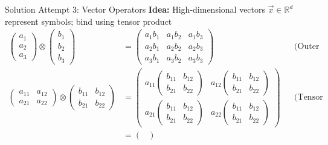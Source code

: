\documentclass[handout,aspectratio=169]{beamer}
\begin{document}
	\begin{frame}{Solution Attempt 3: Vector Operators}
		\centering
		\textbf{Idea:}  High-dimensional vectors $\vec x \in \mathbb{R}^d$ represent symbols; bind using tensor product\\\vspace*{-0.33cm}
		\small
		\begin{align*}
		\begin{pmatrix}a_1\\a_2\\a_3\end{pmatrix} \otimes \begin{pmatrix}b_1\\b_2\\b_3\end{pmatrix} &=
		\begin{pmatrix}
		a_1 b_1 & a_1 b_2 & a_1 b_3 \\
		a_2 b_1 & a_2 b_2 & a_2 b_3 \\
		a_3 b_1 & a_3 b_2 & a_3 b_3
		\end{pmatrix} && \text{(Outer product)} \\[0.25cm]
		\begin{pmatrix}a_{11} & a_{12} \\ a_{21} & a_{22} \end{pmatrix} \otimes
		\begin{pmatrix}b_{11} & b_{12} \\ b_{21} & b_{22} \end{pmatrix} &=
		\begin{pmatrix}
		a_{11} \begin{pmatrix}b_{11} & b_{12} \\ b_{21} & b_{22} \end{pmatrix} &
		a_{12} \begin{pmatrix}b_{11} & b_{12} \\ b_{21} & b_{22} \end{pmatrix} \\
		a_{21} \begin{pmatrix}b_{11} & b_{12} \\ b_{21} & b_{22} \end{pmatrix} &
		a_{22} \begin{pmatrix}b_{11} & b_{12} \\ b_{21} & b_{22} \end{pmatrix}
		\end{pmatrix} && \text{(Tensor product)}\\ &= 
		\begin{pmatrix}

\end{pmatrix}
\end{align*}
\end{frame}
\end{document}
